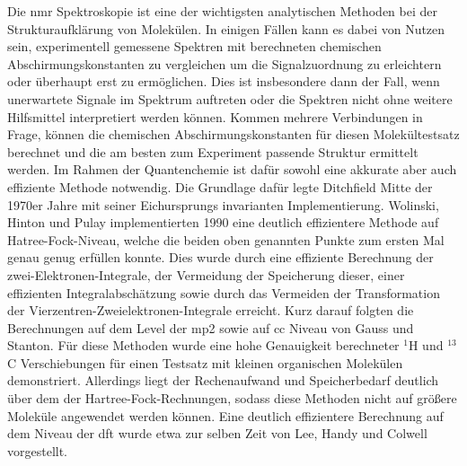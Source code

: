 Die \ac{nmr} Spektroskopie ist eine der wichtigsten analytischen Methoden bei der Strukturaufklärung von Molekülen. In einigen Fällen kann es dabei von Nutzen sein, experimentell gemessene Spektren mit berechneten chemischen Abschirmungskonstanten zu vergleichen um die Signalzuordnung zu erleichtern oder überhaupt erst zu ermöglichen. Dies ist insbesondere dann der Fall, wenn unerwartete Signale im Spektrum auftreten oder die Spektren nicht ohne weitere Hilfsmittel interpretiert werden können. Kommen mehrere Verbindungen in Frage, können die chemischen Abschirmungskonstanten für diesen Molekültestsatz berechnet und die am besten zum Experiment passende Struktur ermittelt werden. Im Rahmen der Quantenchemie ist dafür sowohl eine akkurate aber auch effiziente Methode notwendig. Die Grundlage dafür legte Ditchfield\supercite{ditchfield1974self} Mitte der 1970er Jahre mit seiner Eichursprungs invarianten Implementierung. Wolinski, Hinton und Pulay\supercite{wolinski1990efficient} implementierten 1990 eine deutlich effizientere Methode auf Hatree-Fock-Niveau, welche die beiden oben genannten Punkte zum ersten Mal genau genug erfüllen konnte. Dies wurde durch eine effiziente Berechnung der zwei-Elektronen-Integrale, der Vermeidung der Speicherung dieser, einer effizienten Integralabschätzung sowie durch das Vermeiden der Transformation der Vierzentren-Zweielektronen-Integrale erreicht. Kurz darauf folgten die Berechnungen auf dem Level der \ac{mp2}\supercite{gauss1992calculation} sowie auf \ac{cc}\supercite{gauss1995gauge} Niveau von Gauss und Stanton. Für diese Methoden wurde eine hohe Genauigkeit berechneter $^1$H und $^{13}$C Verschiebungen für einen Testsatz mit kleinen organischen Molekülen demonstriert. Allerdings liegt der Rechenaufwand und Speicherbedarf deutlich über dem der Hartree-Fock-Rechnungen, sodass diese Methoden nicht auf größere Moleküle angewendet werden können. Eine deutlich effizientere Berechnung auf dem Niveau der \ac{dft} wurde etwa zur selben Zeit von Lee, Handy und Colwell\supercite{lee1995density} vorgestellt. 

